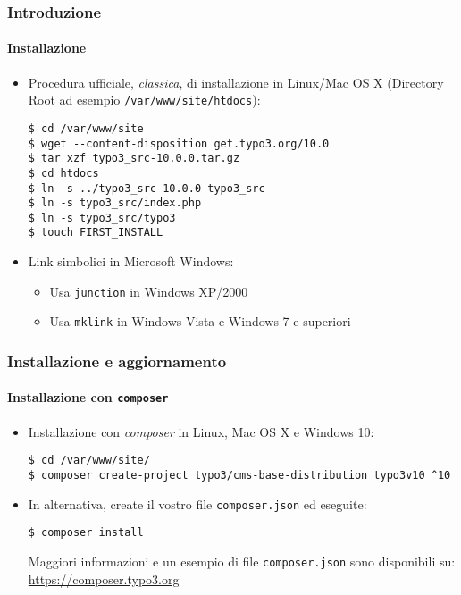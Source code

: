 
\begin{frame}[fragile]
	\frametitle{Introduzione}
	\framesubtitle{Installazione}

	\begin{itemize}
		\item Procedura ufficiale, \textit{classica}, di installazione in Linux/Mac OS X\newline
			(Directory Root ad esempio \texttt{/var/www/site/htdocs}):
		\begin{lstlisting}
$ cd /var/www/site
$ wget --content-disposition get.typo3.org/10.0
$ tar xzf typo3_src-10.0.0.tar.gz
$ cd htdocs
$ ln -s ../typo3_src-10.0.0 typo3_src
$ ln -s typo3_src/index.php
$ ln -s typo3_src/typo3
$ touch FIRST_INSTALL
		\end{lstlisting}

		\item Link simbolici in Microsoft Windows:

			\begin{itemize}
				\item Usa \texttt{junction} in Windows XP/2000
				\item Usa \texttt{mklink} in Windows Vista e Windows 7 e superiori
			\end{itemize}

	\end{itemize}
\end{frame}


\begin{frame}[fragile]
	\frametitle{Installazione e aggiornamento}
	\framesubtitle{Installazione con \texttt{composer}}

	\begin{itemize}
		\item Installazione con \textit{composer} in Linux, Mac OS X e Windows 10:

			\begin{lstlisting}
$ cd /var/www/site/
$ composer create-project typo3/cms-base-distribution typo3v10 ^10
			\end{lstlisting}

		\item In alternativa, create il vostro file \texttt{composer.json} ed eseguite:

			\begin{lstlisting}
$ composer install
			\end{lstlisting}

			Maggiori informazioni e un esempio di file \texttt{composer.json} sono disponibili su:\newline
			\smaller
				\href{https://composer.typo3.org}{https://composer.typo3.org}
			\normalsize

	\end{itemize}
\end{frame}

